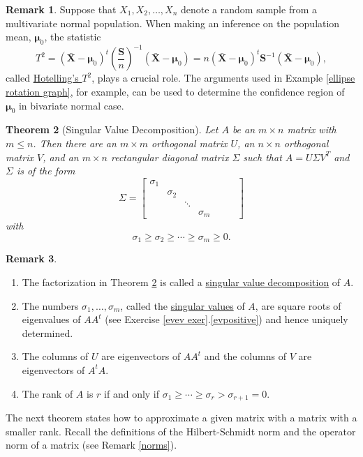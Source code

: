 \documentclass[12pt,letterpaper]{book}
\numberwithin{equation}{section}
\newtheorem{thm}{\textbf{Theorem}}[section]
\theoremstyle{definition}
\newtheorem{remark}[thm]{\textbf{Remark}}
\newcommand{\vmu}{\bm{\mu}}
\newcommand{\vS}{\bm{S}}
\newcommand{\vX}{\bm{X}}
\begin{document}
\begin{remark}
Suppose that $X_1,X_2,\ldots,X_n$ denote a random sample from a multivariate normal population. When making an inference on the population mean, $\vmu_0$, the statistic
$$T^2=(\bar{\vX}-\vmu_0)^t\left(\frac{\vS}{n}\right)^{-1}(\bar{\vX}-\vmu_0)=n(\bar{\vX}-\vmu_0)^t \vS^{-1}(\bar{\vX}-\vmu_0),$$
called \underline{Hotelling's $T^2$}, plays a crucial role. The arguments used in Example \ref{ellipse rotation graph}, for example, can be used to determine the confidence region of $\vmu_0$ in bivariate normal case. 
\end{remark}

\begin{thm}[Singular Value Decomposition]\label{SVD} Let $A$ be an $m\times n$ matrix with $m\leq n$. Then there are an $m\times m$ orthogonal matrix $U$, an $n\times n$ orthogonal matrix $V$, and an $m\times n$ rectangular diagonal matrix $\Sigma$ such that $A=U\Sigma V^T$ and $\Sigma$ is of the form
$$\Sigma=\left[\begin{array}{ccccccc} \sigma_1 & & & &&& \\ & \sigma_2 & &&&& \\ & & \ddots &&&& \\ & & & \sigma_m&&& \end{array}\right]$$ with
$$\sigma_1\geq \sigma_2\geq \cdots \geq \sigma_m\geq 0.$$
\end{thm}

\begin{remark}\quad
\begin{enumerate}
\item The factorization in Theorem \ref{SVD} is called a \underline{singular value decomposition} of $A$.
\item The numbers $\sigma_1,\ldots,\sigma_m$, called the \underline{singular values} of $A$, are square roots of eigenvalues of $AA^t$ (see Exercise \ref{evev exer}.\ref{evpositive}) and hence uniquely determined.
\item The columns of $U$ are eigenvectors of $AA^t$ and the columns of $V$ are eigenvectors of $A^tA$.
\item The rank of $A$ is $r$ if and only if $\sigma_1\geq \cdots \geq \sigma_r>\sigma_{r+1}=0$.
\end{enumerate}
\end{remark}

The next theorem states how to approximate a given matrix with a matrix with a smaller rank. Recall the definitions of the Hilbert-Schmidt norm and the operator norm of a matrix (see Remark \ref{norms}).
\end{document}
